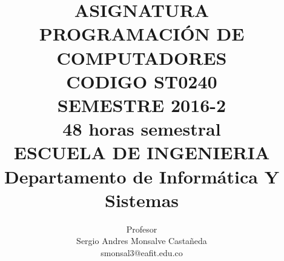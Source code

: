 \documentclass[11pt,letterpaper]{article}
\title{
	ASIGNATURA\\
	PROGRAMACIÓN DE COMPUTADORES\\
	CODIGO ST0240\\[2cm]
	SEMESTRE 2016-2\\
	48 horas semestral\\
	ESCUELA DE INGENIERIA\\[1cm]
	Departamento de Informática Y Sistemas
}
\author{
	Profesor\\
	Sergio Andres Monsalve Castañeda\\
	smonsal3@eafit.edu.co
}
\begin{document}
 
\pagestyle{fancyplain}
\fancyhf{}
\headheight=20pt %
\renewcommand{\headrulewidth}{0pt} %


\fancyfoot[c]{\thepage}

\maketitle

\begin{minipage}{3cm}
\end{minipage}



%





\end{document}
